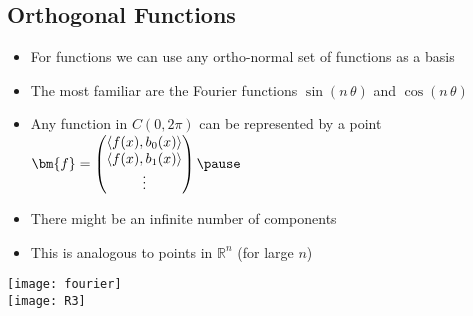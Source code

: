 \begin{slide}
\section[-1]{Orthogonal Functions}

\begin{PauseHighLight}
  \begin{minipage}{0.75\linewidth}
    \begin{itemize}
    \item For functions we can use any ortho-normal set of functions as
      a basis\pause
    \item The most familiar are the Fourier functions $\sin(n\,\theta)$
      and $\cos(n\,\theta)$\pause
    \item Any function in $C(0,2\pi)$ can be represented by a point
      $\bm{f} = \begin{pmatrix}
      \langle f(x), b_0(x) \rangle \\ 
      \langle f(x), b_1(x) \rangle \\ 
      \vdots
    \end{pmatrix}\pause$
  \item There might be an infinite number of components\pause
  \item This is analogous to points in $\mathbb{R}^n$ (for large $n$)\pause
    \end{itemize}
  \end{minipage}
  \begin{minipage}{0.23\linewidth}
    \begin{center}
      \texttt{[image: fourier]}\\
      \vspace*{1cm}
      \texttt{[image: R3]}
    \end{center}
  \end{minipage}
\end{PauseHighLight}

\end{slide}




